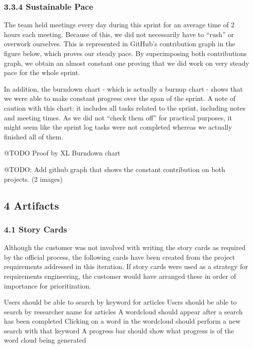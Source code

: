 \documentclass[]{article}
\begin{document}
\subsubsection{3.3.4 Sustainable Pace}\label{sustainable-pace}

The team held meetings every day during this sprint for an average time
of 2 hours each meeting. Because of this, we did not necessarily have to
``rush'' or overwork ourselves. This is represented in GitHub's
contribution graph in the figure below, which proves our steady pace. By
superimposing both contributions graph, we obtain an almost constant one
proving that we did work on very steady pace for the whole sprint.

In addition, the burndown chart - which is actually a burnup chart -
shows that we were able to make constant progress over the span of the
sprint. A note of caution with this chart: it includes all tasks related
to the sprint, including notes and meeting times. As we did not ``check
them off'' for practical purposes, it might seem like the sprint log
tasks were not completed whereas we actually finished all of them.

@TODO Proof by XL Burndown chart

@TODO: Add github graph that shows the constant contribution on both
projects. (2 images)

\subsection{4 Artifacts}\label{artifacts}

\subsubsection{4.1 Story Cards}\label{story-cards}

Although the customer was not involved with writing the story cards as
required by the official process, the following cards have been created
from the project requirements addressed in this iteration. If story
cards were used as a strategy for requirements engineering, the customer
would have arranged these in order of importance for prioritization.

Users should be able to search by keyword for articles Users should be
able to search by researcher name for articles A wordcloud should appear
after a search has been completed Clicking on a word in the wordcloud
should perform a new search with that keyword A progress bar should show
what progress is of the word cloud being generated
\end{document}
